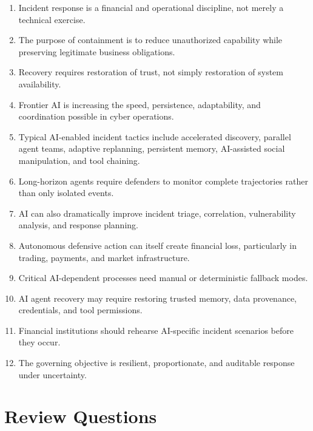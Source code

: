 \begin{enumerate}
    \item Incident response is a financial and operational discipline, not merely a technical exercise.
    \item The purpose of containment is to reduce unauthorized capability while preserving legitimate business obligations.
    \item Recovery requires restoration of trust, not simply restoration of system availability.
    \item Frontier AI is increasing the speed, persistence, adaptability, and coordination possible in cyber operations.
    \item Typical AI-enabled incident tactics include accelerated discovery, parallel agent teams, adaptive replanning, persistent memory, AI-assisted social manipulation, and tool chaining.
    \item Long-horizon agents require defenders to monitor complete trajectories rather than only isolated events.
    \item AI can also dramatically improve incident triage, correlation, vulnerability analysis, and response planning.
    \item Autonomous defensive action can itself create financial loss, particularly in trading, payments, and market infrastructure.
    \item Critical AI-dependent processes need manual or deterministic fallback modes.
    \item AI agent recovery may require restoring trusted memory, data provenance, credentials, and tool permissions.
    \item Financial institutions should rehearse AI-specific incident scenarios before they occur.
    \item The governing objective is resilient, proportionate, and auditable response under uncertainty.
\end{enumerate}

\section{Review Questions}

